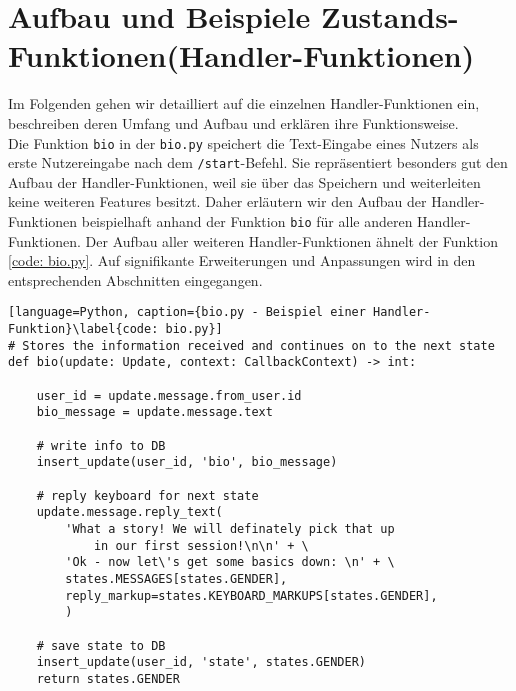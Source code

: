     \section{Aufbau und Beispiele Zustands-Funktionen(Handler-Funktionen)} \label{Implementierung: Handler Functions}
        Im Folgenden gehen wir detailliert auf die einzelnen Handler-Funktionen ein, beschreiben deren Umfang und Aufbau und erklären ihre Funktionsweise. \\
        Die Funktion \verb|bio| in der \verb|bio.py| speichert die Text-Eingabe eines Nutzers als erste Nutzereingabe nach dem \verb|/start|-Befehl. Sie repräsentiert besonders gut den Aufbau der Handler-Funktionen, weil sie über das Speichern und weiterleiten keine weiteren Features besitzt. Daher erläutern wir den Aufbau der Handler-Funktionen beispielhaft anhand der Funktion \verb|bio| für alle anderen Handler-Funktionen. Der Aufbau aller weiteren Handler-Funktionen ähnelt der Funktion \ref*{code: bio.py}. Auf signifikante Erweiterungen und Anpassungen wird in den entsprechenden Abschnitten eingegangen.

            \begin{lstlisting}[language=Python, caption={bio.py - Beispiel einer Handler-Funktion}\label{code: bio.py}]
# Stores the information received and continues on to the next state
def bio(update: Update, context: CallbackContext) -> int:
    
    user_id = update.message.from_user.id
    bio_message = update.message.text
    
    # write info to DB
    insert_update(user_id, 'bio', bio_message)

    # reply keyboard for next state
    update.message.reply_text(
        'What a story! We will definately pick that up 
            in our first session!\n\n' + \
        'Ok - now let\'s get some basics down: \n' + \
        states.MESSAGES[states.GENDER],
        reply_markup=states.KEYBOARD_MARKUPS[states.GENDER],
        )

    # save state to DB
    insert_update(user_id, 'state', states.GENDER)
    return states.GENDER
            \end{lstlisting}


